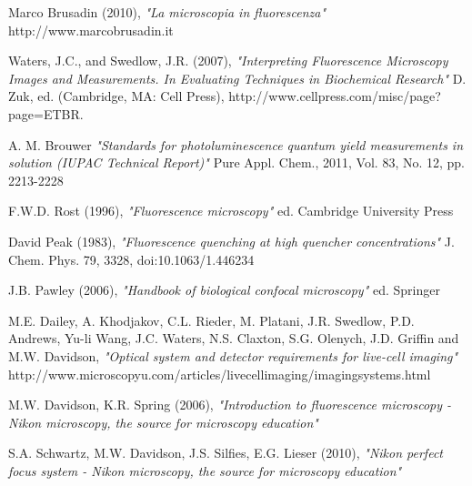 \clearpage{\pagestyle{empty}\cleardoublepage}

\begin{thebibliography}{3}



 Marco Brusadin (2010), \emph{"La microscopia in fluorescenza"} \newline  http://www.marcobrusadin.it

 Waters, J.C., and Swedlow, J.R. (2007), \emph {"Interpreting Fluorescence Microscopy Images and Measurements. In Evaluating Techniques in Biochemical Research"} \newline D. Zuk, ed. (Cambridge, MA: Cell Press), \newline http://www.cellpress.com/misc/page?page=ETBR.

 A. M. Brouwer \emph{"Standards for photoluminescence quantum yield measurements in solution (IUPAC Technical Report)"} \newline Pure Appl. Chem., 2011, Vol. 83, No. 12, pp. 2213-2228

 F.W.D. Rost (1996), \emph{"Fluorescence microscopy"} \newline ed. Cambridge University Press

 David Peak (1983), \emph{"Fluorescence quenching at high quencher concentrations"} \newline J. Chem. Phys. 79, 3328, doi:10.1063/1.446234

 J.B. Pawley (2006), \emph{"Handbook of biological confocal microscopy"} \newline ed. Springer

 M.E. Dailey, A. Khodjakov, C.L. Rieder, M. Platani, J.R. Swedlow, P.D. Andrews, Yu-li Wang, J.C. Waters, N.S. Claxton, S.G. Olenych, J.D. Griffin and M.W. Davidson, \emph{"Optical system and detector requirements for live-cell imaging"} \newline http://www.microscopyu.com/articles/livecellimaging/imagingsystems.html

 M.W. Davidson, K.R. Spring (2006), \emph{"Introduction to fluorescence microscopy - Nikon microscopy, the source for microscopy education"} 

 S.A. Schwartz, M.W. Davidson, J.S. Silfies, E.G. Lieser (2010), \emph{"Nikon perfect focus system - Nikon microscopy, the source for microscopy education"} 


\end{thebibliography}
